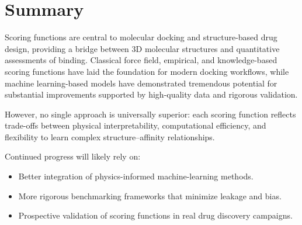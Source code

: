 \documentclass[12pt]{article}
\begin{document}
\section{Summary}

Scoring functions are central to molecular docking and structure-based drug design, providing a bridge between 3D molecular structures and quantitative assessments of binding. Classical force field, empirical, and knowledge-based scoring functions have laid the foundation for modern docking workflows, while machine learning-based models have demonstrated tremendous potential for substantial improvements  supported by high-quality data and rigorous validation.

However, no single approach is universally superior: each scoring function reflects trade-offs between physical interpretability, computational efficiency, and flexibility to learn complex structure--affinity relationships. 

Continued progress will likely rely on:
\begin{itemize}
    \item Better integration of physics-informed machine-learning methods.
    \item More rigorous benchmarking frameworks that minimize leakage and bias.
    \item Prospective validation of scoring functions in real drug discovery campaigns.
\end{itemize}


\end{document}
